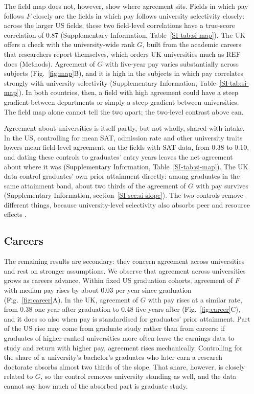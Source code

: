 \documentclass[11pt]{article}
\newcommand{\SIsec}[1]{Supplementary Information, section~\ref{SI-#1}}
\newcommand{\SItab}[1]{Supplementary Information, Table~\ref{SI-#1}}
\begin{document}
The field map does not, however, show where agreement sits. Fields in which pay follows $F$ closely are the fields in
which pay follows university selectivity closely: across the larger US fields, these two field-level correlations have
a true-score correlation of 0.87 (\SItab{tab:si-map}). The UK offers a check with the university-wide rank $G$, built
from the academic careers that researchers report themselves, which orders UK universities much as REF does
(Methods). Agreement of $G$ with five-year pay varies substantially across subjects
(Fig.~\ref{fig:map}B), and it is high in the subjects in which pay correlates strongly with university selectivity
(\SItab{tab:si-map}). In both countries, then, a field with high agreement could have a steep gradient between
departments or simply a steep gradient between universities. The field map alone cannot tell the two apart; the
two-level contrast above can.

Agreement about universities is itself partly, but not wholly, shared with intake. In the US, controlling for mean
SAT, admission rate and other university traits lowers mean field-level agreement, on the fields with SAT data, from
0.38 to 0.10, and dating these controls to graduates' entry years leaves the net agreement about where it was
(\SItab{tab:si-map}). The UK data control graduates' own prior attainment directly: among graduates in the same
attainment band, about two thirds of the agreement of $G$ with pay survives (\SIsec{sec:si-slope}). The two controls
remove different things, because university-level selectivity also absorbs peer and resource effects
\citep{dale2002estimating}.

\subsection*{Careers}

The remaining results are secondary: they concern agreement across universities and rest on stronger
assumptions. We observe that agreement across universities grows as careers advance. Within fixed US graduation
cohorts, agreement of $F$ with median pay rises by about 0.03 per year since graduation (Fig.~\ref{fig:career}A). In
the UK, agreement of $G$ with pay rises at a similar rate, from 0.38 one year after graduation to 0.48 five years after
(Fig.~\ref{fig:career}C), and it does so also when pay is standardised for graduates' prior attainment. Part of the US
rise may come from graduate study rather than from careers: if graduates of higher-ranked universities more often
leave the earnings data to study and return with higher pay, agreement rises mechanically. Controlling for the share
of a university's bachelor's graduates who later earn a research doctorate absorbs almost two thirds of the slope.
That share, however, is closely related to $G$, so the control removes university standing as well, and the data
cannot say how much of the absorbed part is graduate study.
\end{document}
